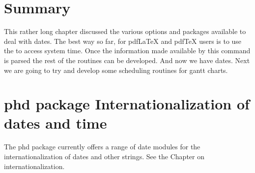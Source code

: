\section{Summary}

This rather long chapter discussed the various options and packages available to deal with dates. The best way so far, for pdfLaTeX and pdfTeX users is to use the  to access system time. Once the information made available by this command is parsed the rest of the routines can be developed. And now we have dates. Next we are going to try and develop some scheduling routines for gantt charts.

\section{phd package Internationalization of dates and time}

The phd package currently offers a range of date modules for the internationalization of dates and other strings. See the Chapter on internationalization.
























































